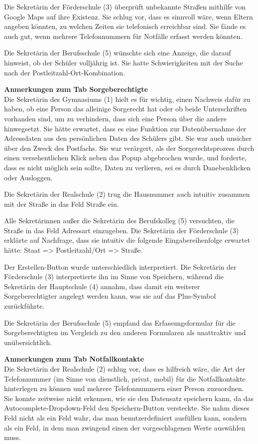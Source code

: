 Die Sekretärin der Förderschule (3) überprüft unbekannte Straßen mithilfe von Google Maps auf ihre Existenz. Sie schlug vor, dass es sinnvoll wäre, wenn Eltern angeben könnten, zu welchen Zeiten sie telefonisch erreichbar sind. Sie fände es auch gut, wenn mehrere Telefonnummern für Notfälle erfasst werden könnten.

Die Sekretärin der Berufsschule (5) wünschte sich eine Anzeige, die darauf hinweist, ob der Schüler volljährig ist. Sie hatte Schwierigkeiten mit der Suche nach der Postleitzahl-Ort-Kombination.

\textbf{Anmerkungen zum Tab \glqq Sorgeberechtigte\grqq{}}\\
Die Sekretärin des Gymnasiums (1) hielt es für wichtig, einen Nachweis dafür zu haben, ob eine Person das alleinige Sorgerecht hat oder ob beide Unterschriften vorhanden sind, um zu verhindern, dass sich eine Person über die andere hinwegsetzt. Sie hätte erwartet, dass es eine Funktion zur Datenübernahme der Adressdaten aus den persönlichen Daten des Schülers gibt. Sie war auch unsicher über den Zweck des Postfachs. Sie war verärgert, als der Sorgerechtsprozess durch einen versehentlichen Klick neben das Popup abgebrochen wurde, und forderte, dass es nicht möglich sein sollte, Daten zu verlieren, sei es durch Danebenklicken oder Ausloggen.

Die Sekretärin der Realschule (2) trug die Hausnummer auch intuitiv zusammen mit der Straße in das Feld \glqq Straße\grqq{} ein.

Alle Sekretärinnen außer die Sekretärin des Berufskolleg (5) versuchten, die Straße in das Feld \glqq Adressart\grqq{} einzugeben. Die Sekretärin der Förderschule (3) erklärte auf Nachfrage, dass sie intuitiv die folgende Eingabereihenfolge erwartet hätte: Staat => Postleitzahl/Ort => Straße.

Der \glqq Erstellen\grqq{}-Button wurde unterschiedlich interpretiert. Die Sekretärin der Förderschule (3) interpretierte ihn im Sinne von \glqq Speichern\grqq{}, während die Sekretärin der Hauptschule (4) annahm, dass damit ein weiterer Sorgeberechtigter angelegt werden kann, was sie auf das Plus-Symbol zurückführte.

Die Sekretärin der Berufsschule (5) empfand das Erfassungsformular für die Sorgeberechtigten im Vergleich zu den anderen Formularen als unattraktiv und unübersichtlich.

\textbf{Anmerkungen zum Tab \glqq Notfallkontakte\grqq{}}\\
Die Sekretärin der Realschule (2) schlug vor, dass es hilfreich wäre, die Art der Telefonnummer (im Sinne von dienstlich, privat, mobil) für die Notfallkontakte hinterlegen zu können und mehrere Telefonnummern einer Person zuzuordnen. Sie konnte zeitweise nicht erkennen, wie sie den Datensatz speichern kann, da das Autocomplete-Dropdown-Feld den Speichern-Button versteckte. Sie nahm dieses Feld nicht als ein Feld wahr, das man benutzerdefiniert ausfüllen kann, sondern als ein Feld, in dem man zwingend einen der vorgeschlagenen Werte auswählen muss.

